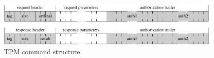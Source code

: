 \documentclass[runningheads]{llncs}
\begin{document}
\begin{figure}[!h]
	\centering
	\includegraphics[width=.9\textwidth]{figures/tpm_command_structure}
	\caption{TPM command structure.}
	\label{fig:tpm_command}\vspace*{-5mm}
\end{figure}


%
\end{document}
